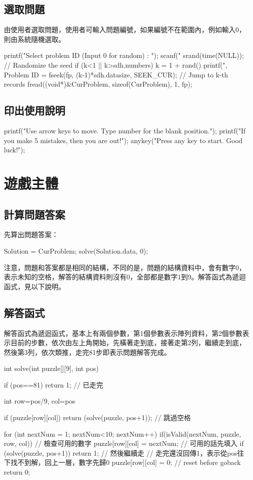 \documentclass[12pt,a4paper]{article}
\begin{document}
\subsection{選取問題}
由使用者選取問題，使用者可輸入問題編號，如果編號不在範圍內，例如輸入0，則由系統隨機選取。
\begin{inside}
printf("Select problem ID (Input 0 for random) : ");
scanf("%
srand(time(NULL)); // Randomize the seed
if (k<1 || k>sdh.numbers) k = 1 + rand() %
printf("\n\nOK, Problem ID = %
fseek(fp, (k-1)*sdh.datasize, SEEK_CUR); // Jump to k-th records
fread((void*)&CurProblem, sizeof(CurProblem), 1, fp);
\end{inside}

\subsection{印出使用說明}
\begin{inside}
	
	printf("Use arrow keys to move. Type number for the blank position.\n");
	printf("If you make 5 mistakes, then you are out!\n");
	anykey("Press any key to start. Good luck!");
\end{inside}

\vspace{0.5cm}
\section{遊戲主體}

\subsection{計算問題答案}
先算出問題答案：
\begin{inside}
Solution = CurProblem;
solve(Solution.data, 0);
\end{inside}
注意，問題和答案都是相同的結構，不同的是，問題的結構資料中，會有數字0，表示未知的空格，解答的結構資料則沒有0，全部都是數字1到9。解答函式為遞迴函式，見以下說明。

\subsection{解答函式}
解答函式為遞迴函式，基本上有兩個參數，第1個參數表示陣列資料，第2個參數表示目前的步數，依次由左上角開始，先橫著走到底，接著走第2列，繼續走到底，然後第3列，依次類推，走完81步即表示問題解答完成。
\begin{inside}
int solve(int puzzle[][9], int pos)
{
	if (pos==81) return 1; // 已走完
	
	int row=pos/9, col=pos%
	
	if (puzzle[row][col]) return (solve(puzzle, pos+1)); // 跳過空格
	
	for (int nextNum = 1; nextNum<10; nextNum++) {
		if(isValid(nextNum, puzzle, row, col)) { // 檢查可用的數字
			puzzle[row][col] = nextNum; // 可用的話先填入
			if (solve(puzzle, pos+1)) return 1; // 然後繼續走
		}
	}
	// 走完還沒回傳1，表示從pos往下找不到解，回上一層，數字先歸0
	puzzle[row][col] = 0; // reset before goback
	return 0;
}
\end{inside}
\end{document}
